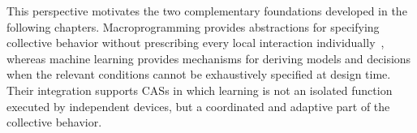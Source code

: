 This perspective motivates the two complementary foundations developed in the following chapters. 
%
Macroprogramming provides abstractions for specifying collective behavior 
 without prescribing every local interaction individually~\cite{DBLP:journals/csur/Casadei23}, 
 whereas machine learning provides mechanisms for deriving models 
 and decisions when the relevant conditions cannot be exhaustively specified at design time. 
% 
Their integration supports \glspl{CAS} in which learning is not an isolated function executed 
 by independent devices, but a coordinated and adaptive part of the collective behavior.